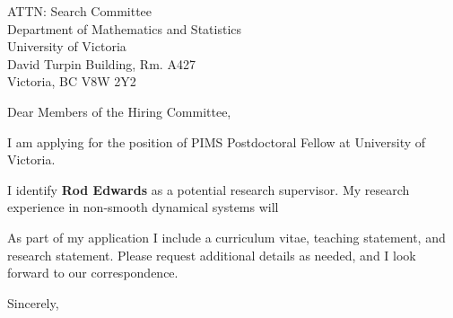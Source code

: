 \documentclass[11pt,a4paper]{letter}
\begin{document}

\def\School{University of Victoria}

\begin{letter}
{ATTN: Search Committee\\
Department of Mathematics and Statistics\\
University of Victoria\\
David Turpin Building, Rm. A427\\
Victoria, BC V8W 2Y2}


\opening{Dear Members of the Hiring Committee,}

I am applying for the position of PIMS Postdoctoral Fellow at \School. 



I identify \textbf{Rod Edwards} as a potential research supervisor. My research experience in non-smooth dynamical systems will 

As part of my application I include a curriculum vitae, teaching statement, and research statement. Please request additional details as needed, and I look forward to our correspondence.

\closing{Sincerely,}
\end{letter}
\end{document}
